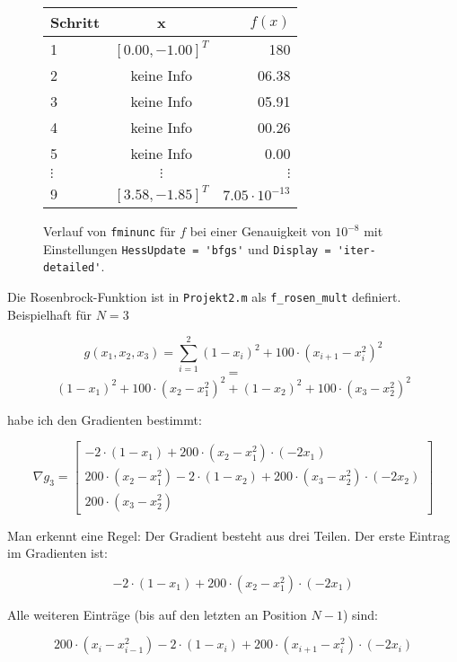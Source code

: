 \documentclass[a4paper, 12pt]{report}
\begin{document}
\begin{figure}[H]
  \centering
  \def\arraystretch{1.25}
  \begin{tabular}{l|c|r}
    \hline
    \textbf{Schritt} & \textbf{x} & \textbf{$f(x)$}\\
    \hline
    1 & $[0.00, -1.00]^T$ & 180\\
    2 & keine Info & 06.38\\
    3 & keine Info & 05.91\\
    4 & keine Info & 00.26\\
    5 & keine Info & 0.00\\
    $\vdots$ & $\vdots$ & $\vdots$\\
    9 & $[3.58, -1.85]^T$ & $7.05\cdot 10^{-13}$\\
    \hline
  \end{tabular}
  \caption{Verlauf von \lstinline[basicstyle=\ttfamily\color{black}]|fminunc| für $f$ bei einer Genauigkeit von $10^{-8}$ mit Einstellungen
  \lstinline[basicstyle=\ttfamily\color{black}]|HessUpdate = 'bfgs'| und \lstinline[basicstyle=\ttfamily\color{black}]|Display = 'iter-detailed'|.}
\end{figure}

Die Rosenbrock-Funktion ist in \lstinline[basicstyle=\ttfamily\color{black}]|Projekt2.m| als 
\lstinline[basicstyle=\ttfamily\color{black}]|f_rosen_mult| definiert. Beispielhaft für $N = 3$

  $$g(x_1, x_2, x_3) = \sum_{i=1}^2 (1 - x_i)^2 + 100\cdot(x_{i+1} - x_i^2)^2$$
  $$=$$
  $$(1 - x_1)^2 + 100\cdot (x_2 - x_1^2)^2 + (1 - x_2)^2 + 100\cdot(x_3 - x_2^2)^2$$

habe ich den Gradienten bestimmt:

\def\arraystretch{1.25}
  $$\nabla g_3 = \begin{bmatrix}-2\cdot(1 - x_1) + 200\cdot(x_2 - x_1^2)\cdot(-2x_1)\\
    200\cdot(x_2 - x_1^2) - 2\cdot(1 - x_2) + 200\cdot(x_3 - x_2^2)\cdot(-2x_2)\\
    200\cdot(x_3 - x_2^2)\end{bmatrix}$$

Man erkennt eine Regel: Der Gradient besteht aus drei Teilen. Der erste Eintrag im Gradienten ist:

$$-2\cdot(1 - x_1) + 200\cdot(x_2 - x_1^2)\cdot(-2x_1)$$

Alle weiteren Einträge (bis auf den letzten an Position $N-1$) sind:

$$200\cdot(x_i - x_{i-1}^2) - 2\cdot(1 - x_i) + 200\cdot(x_{i+1} - x_i^2)\cdot(-2x_i)$$
\end{document}
